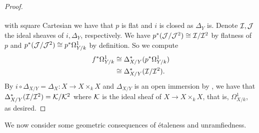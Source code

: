 \begin{proof}
$$\begin{tikzcd}
    \end{tikzcd}$$
    with square Cartesian we have that $p$ is flat and $i$ is closed as $\Delta_{Y}$ is. Denote $\mathcal{I},\mathcal{J}$ the ideal sheaves of $i,\Delta_{Y}$, respectively. We have $p^{*}(\mathcal{J}/\mathcal{J}^{2})\cong\mathcal{I}/\mathcal{I}^{2}$ by flatness of $p$ and $p^{*}(\mathcal{J}/\mathcal{J}^{2})\cong p^{*}\Omega^{1}_{Y/k}$ by definition. So we compute 
    \begin{align*}
        f^{*}\Omega_{Y/k}^{1} &\cong\Delta_{X/Y}^{*}(p^{*}\Omega^{1}_{Y/k}) \\
        &\cong \Delta^{*}_{X/Y}(\mathcal{I}/\mathcal{I}^{2}).
    \end{align*}
    By $i\circ\Delta_{X/Y}=\Delta_{X}:X\to X\times_{k}X$ and $\Delta_{X/Y}$ is an open immersion by , we have that $\Delta^{*}_{X/Y}(\mathcal{I}/\mathcal{I}^{2})=\mathcal{K}/\mathcal{K}^{2}$ where $\mathcal{K}$ is the ideal sheaf of $X\to X\times_{k}X$, that is, $\Omega^{1}_{X/k}$, as desired. 
\end{proof}
We now consider some geometric consequences of \'{e}taleness and unramfiedness. 

